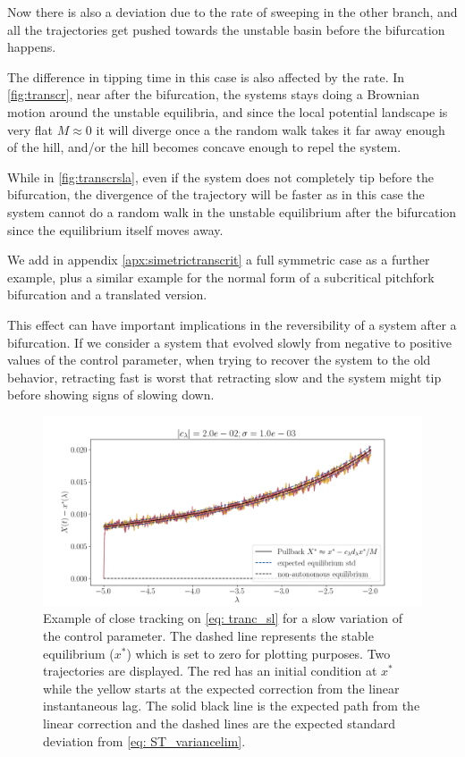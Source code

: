 Now there is also a deviation due to the rate of sweeping in the other branch, and all the trajectories get pushed towards the unstable basin before the bifurcation happens. 

The difference in tipping time in this case is also affected by the rate. 
In \cref{fig:transcr}, near after the bifurcation, the systems stays doing a Brownian motion around the unstable equilibria, and since the local potential landscape is very flat $M\approx 0$ it will diverge once a the random walk takes it far away enough of the hill, and/or the hill becomes concave enough to repel the system.

While in \cref{fig:transcrsla}, even if the system does not completely tip before the bifurcation, the divergence of the trajectory will be faster as in this case the system cannot do a random walk in the unstable equilibrium after the bifurcation since the equilibrium itself moves away. 

We add in appendix \ref{apx:simetrictranscrit} a full symmetric case as a further example, plus a similar example for the normal form of a subcritical pitchfork bifurcation and a translated version.

This effect can have important implications in the reversibility of a system after a bifurcation. If we consider a system that evolved slowly from negative to positive values of the control parameter, when trying to recover the system to the old behavior, retracting fast is worst that retracting slow and the system might tip before showing signs of slowing down. 

\begin{figure}[htb]
	\centering
	\includegraphics[width=1\linewidth]{Images/Metrics/nonnormality/deviation_trancr}
	\caption{Example of close tracking on \cref{eq: tranc_sl} for a slow variation of the control parameter. The dashed line represents the stable equilibrium ($x^*$) which is set to zero for plotting purposes. Two trajectories are displayed. The red has an initial condition at $x^*$ while the yellow starts at the expected correction from the linear instantaneous lag. The solid black line is the expected path from the linear correction and the dashed lines are the expected standard deviation from \cref{eq: ST_variancelim}. }
	\label{fig:deviationtrancr}
\end{figure}

